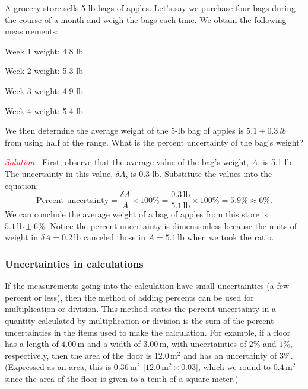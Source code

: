 \documentclass{report}
\begin{document}
    \pagebreak \bigbreak \noindent 
    \begin{exm}
        A grocery store sells 5-lb bags of apples. Let’s say we purchase four bags during the course of a month and weigh the bags each time. We obtain the following measurements:
        \begin{item}
            \item Week 1 weight: 4.8 lb
            \item Week 2 weight: 5.3 lb
            \item Week 3 weight: 4.9 lb
            \item Week 4 weight: 5.4 lb
        \end{item}
        \bigbreak \noindent 
        We then determine the average weight of the 5-lb bag of apples is $5.1 \pm 0.3\ lb$ from using half of the range. What is the percent uncertainty of the bag’s weight?
    \end{exm}
    \bigbreak \noindent 
    \textcolor{red}{\textit{Solution.}} 
    First, observe that the average value of the bag’s weight, $A$, is 5.1 lb. The uncertainty in this value,  $\delta A$, is 0.3 lb. 
  \bigbreak \noindent 
  Substitute the values into the equation:
    \[
        \text{Percent uncertainty} = \frac{\delta A}{A} \times 100\% = \frac{0.3 \, \text{lb}}{5.1 \, \text{lb}} \times 100\% = 5.9\% \approx 6\%.
    \]
    \bigbreak \noindent 
    We can conclude the average weight of a bag of apples from this store is \(5.1 \, \text{lb} \pm 6\%\). Notice the percent uncertainty is dimensionless because the units of weight in \(\delta A = 0.2 \, \text{lb}\) canceled those in \(A = 5.1 \, \text{lb}\) when we took the ratio.

    \bigbreak \noindent 
    \subsubsection{Uncertainties in calculations}
    \bigbreak \noindent 
    If the measurements going into the calculation have small uncertainties (a few percent or less), then the method of adding percents can be used for multiplication or division. This method states the percent uncertainty in a quantity calculated by multiplication or division is the sum of the percent uncertainties in the items used to make the calculation. For example, if a floor has a length of \(4.00 \, \text{m}\) and a width of \(3.00 \, \text{m}\), with uncertainties of \(2\%\) and \(1\%\), respectively, then the area of the floor is \(12.0 \, \text{m}^2\) and has an uncertainty of \(3\%\). (Expressed as an area, this is \(0.36 \, \text{m}^2\) [\(12.0 \, \text{m}^2 \times 0.03\)], which we round to \(0.4 \, \text{m}^2\) since the area of the floor is given to a tenth of a square meter.)
    \bigbreak \noindent 
\end{document}
